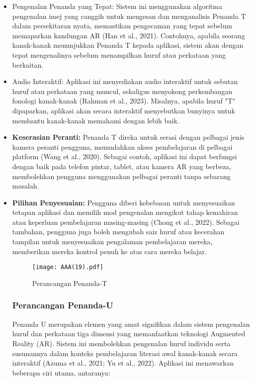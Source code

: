 \begin{itemize}
\begin{itemize}
\begin{itemize}
\begin{itemize}
\begin{itemize}
\item {Pengenalan Penanda yang Tepat:} Sistem ini menggunakan algoritma pengenalan imej yang canggih untuk mengesan dan menganalisis Penanda T dalam persekitaran nyata, memastikan pengecaman yang tepat sebelum memaparkan kandungan AR (Han et al., 2021). Contohnya, apabila seorang kanak-kanak menunjukkan Penanda T kepada aplikasi, sistem akan dengan tepat mengenalinya sebelum menampilkan huruf atau perkataan yang berkaitan.  \\
\item {Audio Interaktif:} Aplikasi ini menyediakan audio interaktif untuk sebutan huruf atau perkataan yang muncul, sekaligus menyokong perkembangan fonologi kanak-kanak (Rahman et al., 2023). Misalnya, apabila huruf "T" dipaparkan, aplikasi akan secara interaktif menyebutkan bunyinya untuk membantu kanak-kanak memahami dengan lebih baik.  \\
\item \textbf{Keserasian Peranti:} Penanda T direka untuk serasi dengan pelbagai jenis kamera peranti pengguna, memudahkan akses pembelajaran di pelbagai platform (Wang et al., 2020). Sebagai contoh, aplikasi ini dapat berfungsi dengan baik pada telefon pintar, tablet, atau kamera AR yang berbeza, membolehkan pengguna menggunakan pelbagai peranti tanpa sebarang masalah.\\  
\item \textbf{Pilihan Penyesuaian:} Pengguna diberi kebebasan untuk menyesuaikan tetapan aplikasi dan memilih mod pengenalan mengikut tahap kemahiran atau keperluan pembelajaran masing-masing (Chong et al., 2022). Sebagai tambahan, pengguna juga boleh mengubah saiz huruf atau kecerahan tampilan untuk menyesuaikan pengalaman pembelajaran mereka, memberikan mereka kontrol penuh ke atas cara mereka belajar.  
\clearpage
 \begin{figure}[h]
     \centering
     \texttt{[image: AAA(19).pdf]}
     \caption{Perancangan Penanda-T}
     \label{fig:enterT}
 \end{figure}
\clearpage
\subsubsection{Perancangan Penanda-U}  
Penanda U merupakan elemen yang amat signifikan dalam sistem pengenalan huruf dan perkataan tiga dimensi yang memanfaatkan teknologi Augmented Reality (AR). Sistem ini membolehkan pengenalan huruf individu serta susunannya dalam konteks pembelajaran literasi awal kanak-kanak secara interaktif (Azuma et al., 2021; Yu et al., 2022). Aplikasi ini menawarkan beberapa ciri utama, antaranya:  


\end{itemize}
\end{itemize}
\end{itemize}
\end{itemize}
\end{itemize}
